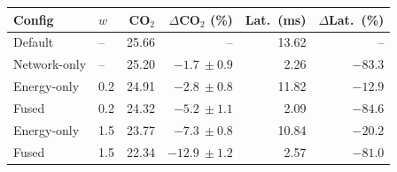 \begin{tabular}{@{}llrrrr@{}}
\toprule
Config & $w$ & CO$_2$ & $\Delta$CO$_2$ (\%) & Lat.\ (ms) & $\Delta$Lat.\ (\%) \\
\midrule
Default & -- & 25.66 & -- & 13.62 & -- \\
Network-only & -- & 25.20 & $-1.7\ \pm0.9$ & 2.26 & $-83.3$ \\
Energy-only & 0.2 & 24.91 & $-2.8\ \pm0.8$ & 11.82 & $-12.9$ \\
Fused & 0.2 & 24.32 & $-5.2\ \pm1.1$ & 2.09 & $-84.6$ \\
\midrule
Energy-only & 1.5 & 23.77 & $-7.3\ \pm0.8$ & 10.84 & $-20.2$ \\
Fused & 1.5 & 22.34 & $-12.9\ \pm1.2$ & 2.57 & $-81.0$ \\
\bottomrule
\end{tabular}
